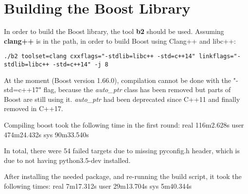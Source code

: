 \chapter{Building the Boost Library}

In order to build the Boost library, the tool \textbf{b2} should be used. Assuming \textbf{clang++} is in the path, in order to build Boost using Clang++ and libc++:

\begin{lstlisting}
./b2 toolset=clang cxxflags="-stdlib=libc++ -std=c++14" linkflags="-stdlib=libc++ -std=c++14" -j 8
\end{lstlisting}

At the moment (Boost version 1.66.0), compilation cannot be done with the "-std=c++17" flag, because the \textit{auto_ptr} class has been removed but parts of Boost are still using it. \textit{auto_ptr} had been deprecated since C++11 and finally removed in C++17.

Compiling boost took the following time in the first round:
real	116m2.628s
user	474m24.432s
sys	90m33.540s

In total, there were 54 failed targets due to missing pyconfig.h header, which is due to not having python3.5-dev installed.

After installing the needed package, and re-running the build script, it took the following times:
real	7m17.312s
user	29m13.704s
sys	5m40.344s
